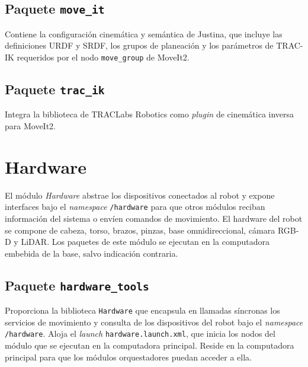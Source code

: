 \subsection{Paquete \texttt{move\_it}}
Contiene la configuración cinemática y semántica de Justina, que incluye las definiciones URDF y SRDF, los grupos de planeación y los parámetros de TRAC-IK requeridos por el nodo \texttt{move\_group} de MoveIt2.

\subsection{Paquete \texttt{trac\_ik}}
Integra la biblioteca de TRACLabs Robotics como \textit{plugin} de cinemática inversa para MoveIt2.


\section[Hardware]{Hardware}
\label{app:justina_hardware}

El módulo \textit{Hardware} abstrae los dispositivos conectados al robot y expone interfaces bajo el \textit{namespace} \texttt{/hardware} para que otros módulos reciban información del sistema o envíen comandos de movimiento. El hardware del robot se compone de cabeza, torso, brazos, pinzas, base omnidireccional, cámara RGB-D y LiDAR. Los paquetes de este módulo se ejecutan en la computadora embebida de la base, salvo indicación contraria.

\subsection{Paquete \texttt{hardware\_tools}}

Proporciona la biblioteca \texttt{Hardware} que encapsula en llamadas síncronas los servicios de movimiento y consulta de los dispositivos del robot bajo el \textit{namespace} \texttt{/hardware}. Aloja el \textit{launch} \texttt{hardware.launch.xml}, que inicia los nodos del módulo que se ejecutan en la computadora principal. Reside en la computadora principal para que los módulos orquestadores puedan acceder a ella.

